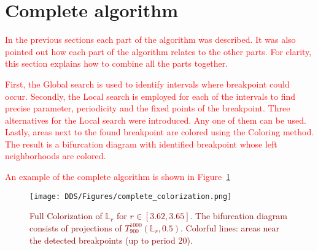 \section{Complete algorithm}
\textcolor{red}{
In the previous sections each part of the algorithm was described.
It was also pointed out how each part of the algorithm relates to the other parts.
For clarity, this section explains how to combine all the parts together.
}
\par
\textcolor{red}{
First, the Global search is used to identify intervals where breakpoint could occur.
Secondly, the Local search is employed for each of the intervals to find precise parameter, periodicity and the fixed points of the breakpoint.
Three alternatives for the Local search were introduced.
Any one of them can be used.
Lastly, areas next to the found breakpoint are colored using the Coloring method.
The result is a bifurcation diagram with identified breakpoint whose left neighborhoods are colored.
}
\par
\textcolor{red}{
An example of the complete algorithm is shown in Figure~\ref{fig:complete_colorization}
}

\begin{figure}[!h]
    \centering
    \texttt{[image: DDS/Figures/complete\_colorization.png]}
    \caption{
        \textcolor{darkred}{
        Full Colorization of $\mathbb{L}_{r}$ for $r \in [ 3.62, 3.65 ]$.
        The bifurcation diagram consists of projections of $T_{900}^{1000}(\mathbb{L}_{r}, 0.5)$.
        Colorful lines: areas near the detected breakpoints (up to period $20$).
        }
    }
    \label{fig:complete_colorization}
\end{figure}

\endinput